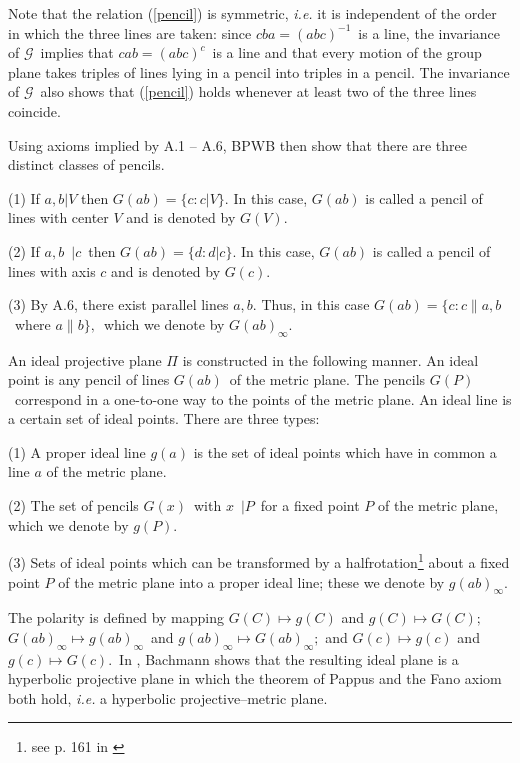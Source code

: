 \documentclass[a4paper,twoside,12pt]{article}
\begin{document}
     Note that the relation (\ref{pencil}) is symmetric, {\it i.e.} it
is independent of the order in which the three lines are taken: since
$cba=(abc)^{-1}$\ is a line, the invariance of $\mathcal{G}$\ implies
that $cab=(abc)^{c}$\ is a line and that every motion of the group
plane takes triples of lines lying in a pencil into triples in a
pencil. The invariance of $\mathcal{G}$\ also shows that
(\ref{pencil}) holds whenever at least two of the three lines
coincide.

     Using axioms implied by A.1 -- A.6, BPWB then show that there are
three distinct classes of pencils.

   (1) If $a,b | V$ then $G(ab)=\{c:c | V\}$. In this case, $G(ab)$ is
called a pencil of lines with center $V$ and is denoted by $G(V)$.

   (2) If $a,b$\ $|c$\ then $G(ab)=\{d:d | c\}$. In this case, $G(ab)$ is
called a pencil of lines with axis $c$ and is denoted by $G(c)$.

   (3) By A.6, there exist parallel lines $a,b$. Thus, in this case 
$G(ab)=\{c:c\parallel a,b$\ where $a\parallel b\},$\ which we denote by 
$G(ab)_{\infty }$. 

     An ideal projective plane $\Pi$ is constructed in the
following manner. An ideal point is any pencil of lines $G(ab)$\ of
the metric plane. The pencils $G(P)$\ correspond in a one-to-one way
to the points of the metric plane. An ideal line is a certain set of
ideal points.  There are three types:

   (1) A proper ideal line $g(a)$ is the set of ideal points which have in
common a line $a$ of the metric plane.

   (2) The set of pencils $G(x)$\ with $x$\ $|P$\ for a fixed point $P$ of
the metric plane, which we denote by $g(P)$.

   (3) Sets of ideal points which can be transformed by a 
halfrotation\footnote{see p. 161 in \cite{BBPW}} about
a fixed point $P$ of the metric plane into a proper ideal line; these we
denote by $g(ab)_{\infty }$.

     The polarity is defined by mapping $G(C)\longmapsto g(C)$ and 
$g(C)\longmapsto G(C);$\ $G(ab)_{\infty }\longmapsto g(ab)_{\infty }$\ and $%
g(ab)_{\infty }\longmapsto G(ab)_{\infty };$ and $G(c)\longmapsto g(c)$ and $%
g(c)\longmapsto G(c).$\ In \cite{Ba}, Bachmann shows that the resulting ideal
plane is a hyperbolic projective plane in which the theorem of Pappus and
the Fano axiom both hold, {\it i.e.} a hyperbolic projective--metric plane.
\end{document}
